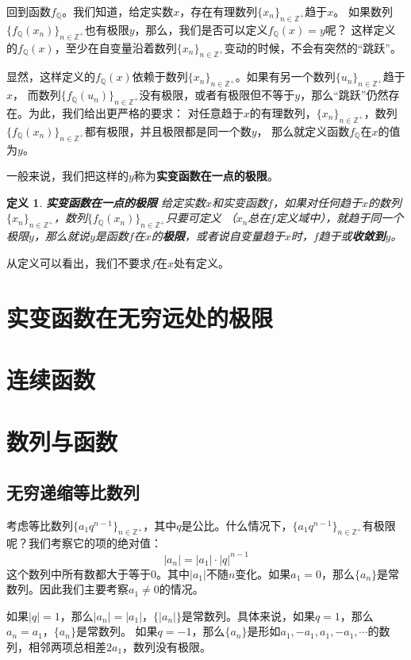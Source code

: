 \documentclass[12pt,UTF8]{ctexbook}
\newtheorem{df}{定义}[section]
\begin{document}
回到函数$f_{\mathbb{Q}}$。我们知道，给定实数$x$，存在有理数列$\{x_n\}_{n\in\mathbb{Z}^+}$趋于$x$。
如果数列$\{f_{\mathbb{Q}}(x_n)\}_{n\in\mathbb{Z}^+}$也有极限$y$，那么，我们是否可以定义$f_{\mathbb{Q}}(x) = y$呢？
这样定义的$f_{\mathbb{Q}}(x)$，至少在自变量沿着数列$\{x_n\}_{n\in\mathbb{Z}^+}$变动的时候，不会有突然的“跳跃”。

显然，这样定义的$f_{\mathbb{Q}}(x)$依赖于数列$\{x_n\}_{n\in\mathbb{Z}^+}$。如果有另一个数列$\{u_n\}_{n\in\mathbb{Z}^+}$趋于$x$，
而数列$\{f_{\mathbb{Q}}(u_n)\}_{n\in\mathbb{Z}^+}$没有极限，或者有极限但不等于$y$，那么“跳跃”仍然存在。为此，我们给出更严格的要求：
对任意趋于$x$的有理数列，$\{x_n\}_{n\in\mathbb{Z}^+}$，数列$\{f_{\mathbb{Q}}(x_n)\}_{n\in\mathbb{Z}^+}$都有极限，并且极限都是同一个数$y$，
那么就定义函数$f_{\mathbb{Q}}$在$x$的值为$y$。

一般来说，我们把这样的$y$称为\textbf{实变函数在一点的极限}。
\begin{df}\textbf{实变函数在一点的极限}
    给定实数$x$和实变函数$f$，如果对任何趋于$x$的数列$\{x_n\}_{n\in\mathbb{Z}^+}$，数列$\{f_{\mathbb{Q}}(x_n)\}_{n\in\mathbb{Z}^+}$只要可定义
    （$x_n$总在$f$定义域中），就趋于同一个极限$y$，那么就说$y$是函数$f$在$x$的\textbf{极限}，或者说自变量趋于$x$时，$f$趋于或\textbf{收敛到}$y$。
\end{df}
从定义可以看出，我们不要求$f$在$x$处有定义。




\section{实变函数在无穷远处的极限}
\section{连续函数}
\section{数列与函数}
\subsection{无穷递缩等比数列}
考虑等比数列$\{a_1 q^{n-1}\}_{n\in\mathbb{Z}^+}$，其中$q$是公比。什么情况下，$\{a_1 q^{n-1}\}_{n\in\mathbb{Z}^+}$有极限呢？我们考察它的项的绝对值：
$$|a_n| = |a_1|\cdot|q|^{n-1}$$
这个数列中所有数都大于等于$0$。其中$|a_1|$不随$n$变化。如果$a_1=0$，那么$\{a_n\}$是常数列。因此我们主要考察$a_1 \neq 0$的情况。

如果$|q|=1$，那么$|a_n| = |a_1|$，$\{|a_n|\}$是常数列。具体来说，如果$q=1$，那么$a_n = a_1$，$\{a_n\}$是常数列。
如果$q = -1$，那么$\{a_n\}$是形如$a_1, -a_1, a_1, -a_1, \cdots$的数列，相邻两项总相差$2a_1$，数列没有极限。
\end{document}

